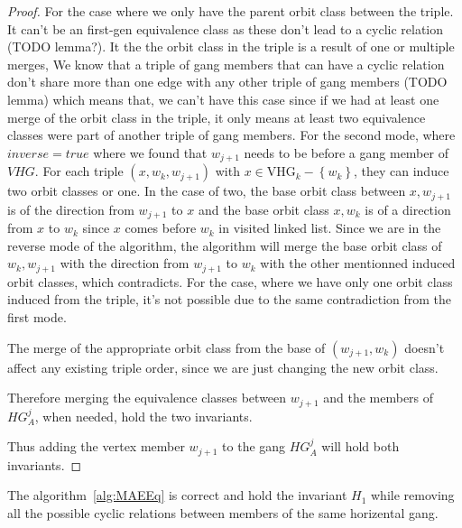 \begin{proof}
    For the case where we only have the parent orbit class between the triple. It can't be an first-gen equivalence class as these don't lead 
    to a cyclic relation (TODO lemma?). It the the orbit class in the triple is a result of one or multiple merges, We know that a triple of
    gang members that can have a cyclic relation don't share more than one edge with any other triple of gang members (TODO lemma) which means that, we can't 
    have this case since if we had at least one merge of the orbit class in the triple, it only means at least two equivalence classes were part 
    of another triple of gang members.
    For the second mode, where $inverse=true$ where we found that $w_{j+1}$ needs to be before a gang member of $VHG$. For each triple  $\left( x, w_k, w_{j+1} \right)$ 
    with $x \in \mathrm{VHG}_k - \left\{w_k\right\}$, they can induce two orbit classes or one. In the case of two, the base orbit class between $x, w_{j+1}$ is 
    of the direction from $w_{j+1}$ to $x$ and the base orbit class $x, w_k$ is of a direction from $x$ to $w_k$ since $x$ comes before $w_k$ in visited linked
    list. Since we are in the reverse mode of the algorithm, the algorithm will merge the base orbit class of $w_k, w_{j+1}$ with the direction from 
    $w_{j+1}$ to $w_k$ with the other mentionned induced orbit classes, which contradicts. For the case, where we have only one orbit class induced from the triple, it's 
    not possible due to the same contradiction from the first mode.

    The merge of the appropriate orbit class from the base of $\left( w_{j+1}, w_k \right)$ doesn't affect any existing triple order, since we are just 
    changing the new orbit class. 

    Therefore merging the equivalence classes between $w_{j+1}$ and the members of $HG_{A}^j$, when needed, hold the two invariants. 

    Thus adding the vertex member $w_{j+1}$ to the gang $HG_{A}^j$ will hold both invariants. 

\end{proof}
\begin{theorem}
    The algorithm~\ref{alg:MAEEq} is correct and hold the invariant $H_1$ while removing all the possible 
    cyclic relations between members of the same horizental gang.
\end{theorem}
